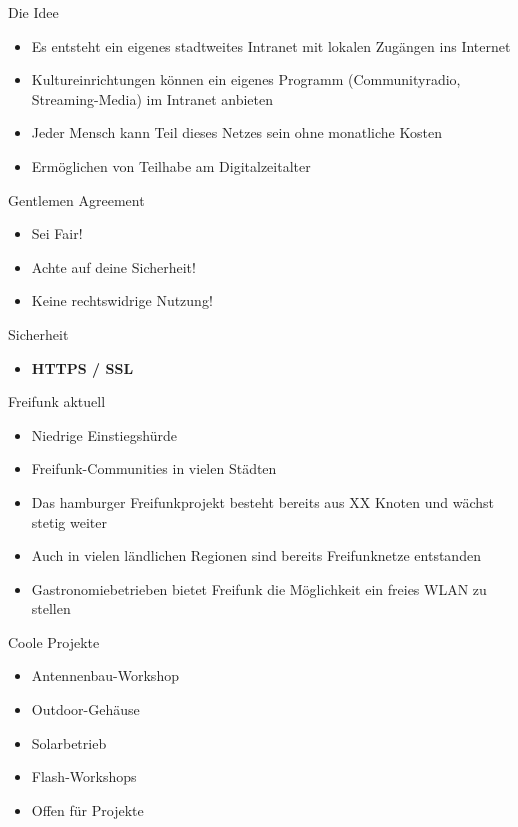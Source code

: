 \documentclass[c]{beamer}
\begin{document}
\begin{frame}{Die Idee}
	\begin{itemize}
		\item Es entsteht ein eigenes stadtweites Intranet mit lokalen Zugängen ins Internet
		\item Kultureinrichtungen können ein eigenes Programm (Communityradio, Streaming-Media) im Intranet anbieten
		\item Jeder Mensch kann Teil dieses Netzes sein ohne monatliche Kosten
		\item Ermöglichen von Teilhabe am Digitalzeitalter
	\end{itemize}
\end{frame}

\begin{frame}{Gentlemen Agreement}
	\begin{itemize}
		\item Sei Fair!
		\item Achte auf deine Sicherheit!
		\item Keine rechtswidrige Nutzung!
	\end{itemize}
\end{frame}

\begin{frame}{Sicherheit}
	\begin{itemize}
		\item \textbf{HTTPS / SSL}
	\end{itemize}
\end{frame}

\begin{frame}{Freifunk aktuell}
	\begin{itemize}
		\item Niedrige Einstiegshürde
		\item Freifunk-Communities in vielen Städten
		\item Das hamburger Freifunkprojekt besteht bereits aus XX Knoten und wächst stetig weiter
		\item Auch in vielen ländlichen Regionen sind bereits Freifunknetze entstanden
		\item Gastronomiebetrieben bietet Freifunk die Möglichkeit ein freies WLAN zu stellen
	\end{itemize}
\end{frame}

\begin{frame}{Coole Projekte}
	\begin{itemize}
		\item Antennenbau-Workshop
		\item Outdoor-Gehäuse
		\item Solarbetrieb
		\item Flash-Workshops
		\item Offen für Projekte
	\end{itemize}
\end{frame}
\end{document}
